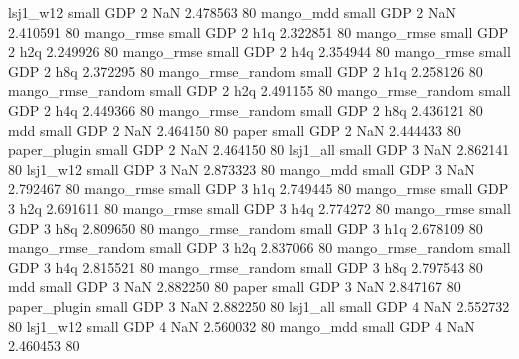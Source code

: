          lsj1_w12      small      GDP                 2                  NaN 2.478563 80
        mango_mdd      small      GDP                 2                  NaN 2.410591 80
       mango_rmse      small      GDP                 2                  h1q 2.322851 80
       mango_rmse      small      GDP                 2                  h2q 2.249926 80
       mango_rmse      small      GDP                 2                  h4q 2.354944 80
       mango_rmse      small      GDP                 2                  h8q 2.372295 80
mango_rmse_random      small      GDP                 2                  h1q 2.258126 80
mango_rmse_random      small      GDP                 2                  h2q 2.491155 80
mango_rmse_random      small      GDP                 2                  h4q 2.449366 80
mango_rmse_random      small      GDP                 2                  h8q 2.436121 80
              mdd      small      GDP                 2                  NaN 2.464150 80
            paper      small      GDP                 2                  NaN 2.444433 80
     paper_plugin      small      GDP                 2                  NaN 2.464150 80
         lsj1_all      small      GDP                 3                  NaN 2.862141 80
         lsj1_w12      small      GDP                 3                  NaN 2.873323 80
        mango_mdd      small      GDP                 3                  NaN 2.792467 80
       mango_rmse      small      GDP                 3                  h1q 2.749445 80
       mango_rmse      small      GDP                 3                  h2q 2.691611 80
       mango_rmse      small      GDP                 3                  h4q 2.774272 80
       mango_rmse      small      GDP                 3                  h8q 2.809650 80
mango_rmse_random      small      GDP                 3                  h1q 2.678109 80
mango_rmse_random      small      GDP                 3                  h2q 2.837066 80
mango_rmse_random      small      GDP                 3                  h4q 2.815521 80
mango_rmse_random      small      GDP                 3                  h8q 2.797543 80
              mdd      small      GDP                 3                  NaN 2.882250 80
            paper      small      GDP                 3                  NaN 2.847167 80
     paper_plugin      small      GDP                 3                  NaN 2.882250 80
         lsj1_all      small      GDP                 4                  NaN 2.552732 80
         lsj1_w12      small      GDP                 4                  NaN 2.560032 80
        mango_mdd      small      GDP                 4                  NaN 2.460453 80
